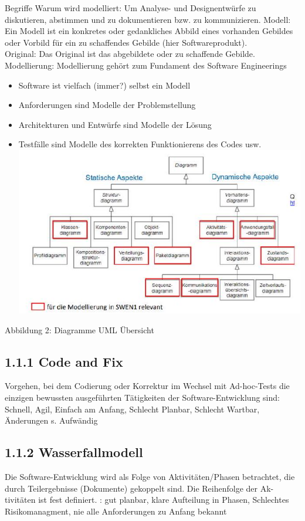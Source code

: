 \documentclass[10pt]{article}
\begin{document}
Begriffe Warum wird modelliert: Um Analyse- und Designentwürfe zu diskutieren, abstimmen und zu dokumentieren bzw. zu kommunizieren. Modell: Ein Modell ist ein konkretes oder gedankliches Abbild eines vorhanden Gebildes oder Vorbild für ein zu schaffendes Gebilde (hier Softwareprodukt).\\
Original: Das Original ist das abgebildete oder zu schaffende Gebilde.\\
Modellierung: Modellierung gehört zum Fundament des Software Engineerings

\begin{itemize}
  \item Software ist vielfach (immer?) selbst ein Modell
  \item Anforderungen sind Modelle der Problemstellung
  \item Architekturen und Entwürfe sind Modelle der Lösung
  \item Testfälle sind Modelle des korrekten Funktionierens des Codes usw.\\
\includegraphics[width=\linewidth]{images/2024_12_29_0d1d7b5551ea1b4b41bdg-01(1)}
\end{itemize}

Abbildung 2: Diagramme UML Übersicht

\subsection*{1.1.1 Code and Fix}
Vorgehen, bei dem Codierung oder Korrektur im Wechsel mit Ad-hoc-Tests die einzigen bewussten ausgeführten Tätigkeiten der Software-Entwicklung sind: Schnell, Agil, Einfach am Anfang, Schlecht Planbar, Schlecht Wartbar, Änderungen s. Aufwändig

\subsection*{1.1.2 Wasserfallmodell}
Die Software-Entwicklung wird als Folge von Aktivitäten/Phasen betrachtet, die durch Teilergebnisse (Dokumente) gekoppelt sind. Die Reihenfolge der Ak-\\
tivitäten ist fest definiert. : gut planbar, klare Aufteilung in Phasen, Schlechtes Risikomanagment, nie alle Anforderungen zu Anfang bekannt
\end{document}
